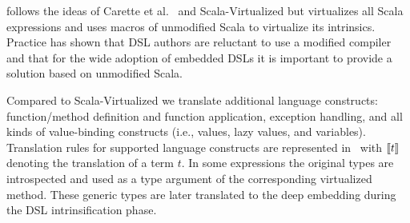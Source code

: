  \yy follows the ideas of Carette et al.~\cite{carette_finally_2009}
 and Scala-Virtualized but virtualizes all Scala expressions and uses macros of
  unmodified Scala to virtualize its intrinsics. Practice has shown that DSL
  authors are reluctant to use a modified compiler and that for the wide adoption
  of embedded DSLs it is important to provide a solution based on unmodified Scala.

 Compared to Scala-Virtualized we translate additional language constructs:
  function/method definition and function application, exception handling, and all kinds of value-binding constructs
  (i.e., values, lazy values, and variables). Translation rules for supported language constructs are
  represented in~ with $\llbracket t \rrbracket$ denoting the translation of a term $t$. In some expressions
  the original types are introspected and used as a type argument of the corresponding virtualized method. These
  generic types are later translated to the deep embedding during the DSL intrinsification phase.

